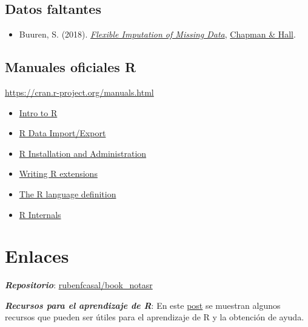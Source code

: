 \documentclass[
]{book}
\providecommand{\tightlist}{%
  \setlength{\itemsep}{0pt}\setlength{\parskip}{0pt}}
\theoremstyle{break}
\theoremstyle{nonumberplain}
\begin{document}
\hypertarget{datos-faltantes}{%
\subsection*{Datos faltantes}\label{datos-faltantes}}

\begin{itemize}
\tightlist
\item
  Buuren, S. (2018). \emph{\href{https://stefvanbuuren.name/fimd}{Flexible Imputation of Missing Data}}, \href{}{Chapman \& Hall}.
\end{itemize}

\hypertarget{manuales-oficiales-r}{%
\subsection*{Manuales oficiales R}\label{manuales-oficiales-r}}

\url{https://cran.r-project.org/manuals.html}

\begin{itemize}
\item
  \href{http://colinfay.me/intro-to-r/}{Intro to R}
\item
  \href{http://colinfay.me/r-data-import-export/}{R Data Import/Export}
\item
  \href{http://colinfay.me/r-installation-administration/}{R Installation and Administration}
\item
  \href{http://colinfay.me/writing-r-extensions/}{Writing R extensions}
\item
  \href{http://colinfay.me/r-language-definition/}{The R language definition}
\item
  \href{http://colinfay.me/r-internals/}{R Internals}
\end{itemize}

\hypertarget{links}{%
\section*{Enlaces}\label{links}}

\textbf{\emph{Repositorio}}: \href{https://github.com/rubenfcasal/book_notasr}{rubenfcasal/book\_notasr}

\textbf{\emph{Recursos para el aprendizaje de R}}: En este \href{https://rubenfcasal.github.io/post/ayuda-y-recursos-para-el-aprendizaje-de-r}{post} se muestran algunos recursos que pueden ser útiles para el aprendizaje de R y la obtención de ayuda.
\end{document}
